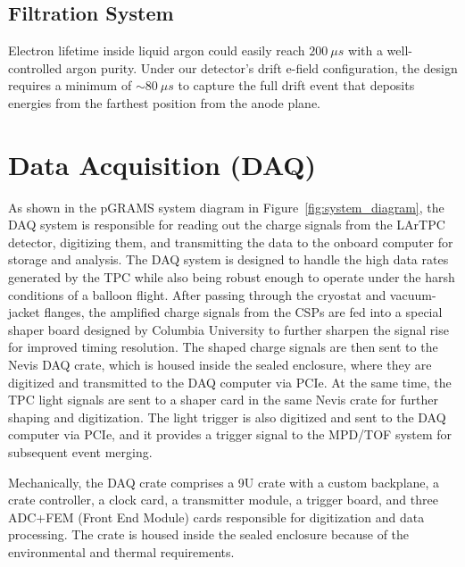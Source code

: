 \documentclass[a4paper,fleqn,longmktitle]{cas-dc}
\begin{document}
\subsection{Filtration System}\label{chap:detector:LArTPC:filter}
Electron lifetime inside liquid argon could easily reach $ 200~\mu s$ with a well-controlled argon purity. Under our detector's drift e-field configuration, the design requires a minimum of $\sim80\ \mu s$ to capture the full drift event that deposits energies from the farthest position from the anode plane.


\section{Data Acquisition (DAQ)}\label{chap:DAQ}
As shown in the pGRAMS system diagram in Figure~\ref{fig:system_diagram}, the DAQ system is responsible for reading out the charge signals from the LArTPC detector, digitizing them, and transmitting the data to the onboard computer for storage and analysis. The DAQ system is designed to handle the high data rates generated by the TPC while also being robust enough to operate under the harsh conditions of a balloon flight. After passing through the cryostat and vacuum-jacket flanges, the amplified charge signals from the CSPs are fed into a special shaper board designed by Columbia University to further sharpen the signal rise for improved timing resolution. The shaped charge signals are then sent to the Nevis DAQ crate, which is housed inside the sealed enclosure, where they are digitized and transmitted to the DAQ computer via PCIe. At the same time, the TPC light signals are sent to a shaper card in the same Nevis crate for further shaping and digitization. The light trigger is also digitized and sent to the DAQ computer via PCIe, and it provides a trigger signal to the MPD/TOF system for subsequent event merging.

Mechanically, the DAQ crate comprises a 9U crate with a custom backplane, a crate controller, a clock card, a transmitter module, a trigger board, and three ADC+FEM (Front End Module) cards responsible for digitization and data processing. The crate is housed inside the sealed enclosure because of the environmental and thermal requirements. 
\end{document}

